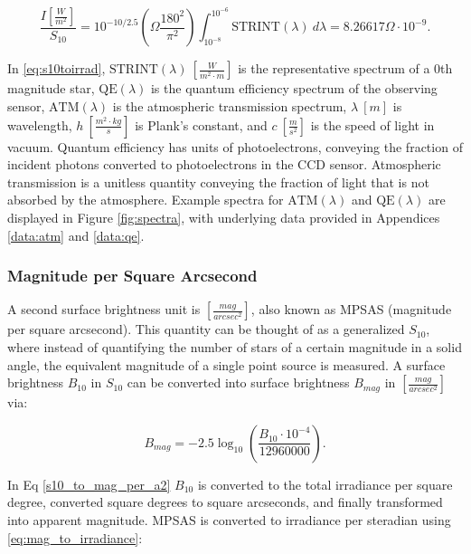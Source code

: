\begin{equation} \label{eq:s10toirrad}
 \frac{I \left[ \frac{W}{m^2} \right]}{S_{10}} = 10^{-10/2.5} \left( \Omega \frac{180^2}{\pi^2} \right)
  \int_{10^{-8}}^{10^{-6}}{ \textrm{STRINT}(\lambda) \: d\lambda} = 8.26617 \Omega \cdot 10^{-9}.
\end{equation}

In \ref{eq:s10toirrad}, $\textrm{STRINT}(\lambda) \: \left[ \frac{W}{m^2 \cdot m} \right]$ is the
representative spectrum of a 0th magnitude star, $\textrm{QE}(\lambda)$ is the quantum efficiency
spectrum of the observing sensor, $\textrm{ATM}(\lambda)$ is the atmospheric transmission spectrum, $\lambda \: [m]$ is wavelength, $h \: \left[
\frac{m^2 \cdot kg}{s} \right]$ is Plank's constant, and $c \: \left[ \frac{m}{s^2} \right]$ is the
speed of light in vacuum. Quantum efficiency has units of photoelectrons, conveying the fraction of incident photons converted to photoelectrons in the CCD sensor. Atmospheric transmission is a unitless quantity conveying the fraction of light that is not absorbed by the atmosphere. Example spectra for $\textrm{ATM}(\lambda)$ and $\textrm{QE}(\lambda)$ are displayed in Figure \ref{fig:spectra}, with underlying data provided in Appendices \ref{data:atm} and \ref{data:qe}.

\subsubsection{Magnitude per Square Arcsecond}

A second surface brightness unit is $\left[ \frac{mag}{arcsec^2} \right]$, also known as MPSAS (magnitude per square arcsecond). This quantity can be thought of as a generalized $S_{10}$, where instead of quantifying the number of stars of a certain
magnitude in a solid angle, the equivalent magnitude of a single point source is measured. A surface
brightness $B_{10}$ in $S_{10}$ can be converted into surface brightness $B_{mag}$ in 
$\left[ \frac{mag}{arcsec^2} \right]$ via:

\begin{equation} \label{s10_to_mag_per_a2}
	B_{mag} = -2.5 \log_{10}\left( \frac{B_{10} \cdot 10^{-4}}{12960000} \right).
\end{equation}

In Eq \ref{s10_to_mag_per_a2} $B_{10}$ is converted to the total irradiance per square degree,
converted square degrees to square arcseconds, and finally transformed into apparent magnitude. MPSAS is converted to irradiance per steradian using \ref{eq:mag_to_irradiance}:

